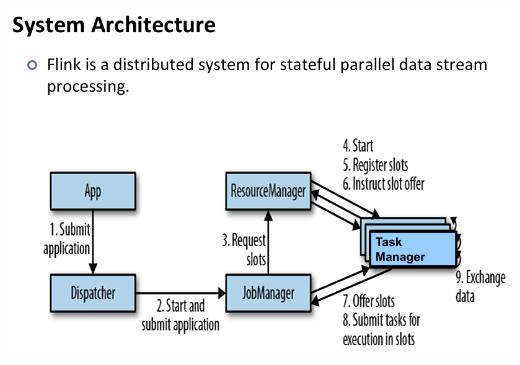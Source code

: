 \documentclass[10pt, landscape]{article}
\begin{document}
\begin{multicols*}{4}
  \includegraphics[width=0.95\linewidth]{flink_sys_architecture.png}


\end{multicols*}
\end{document}
